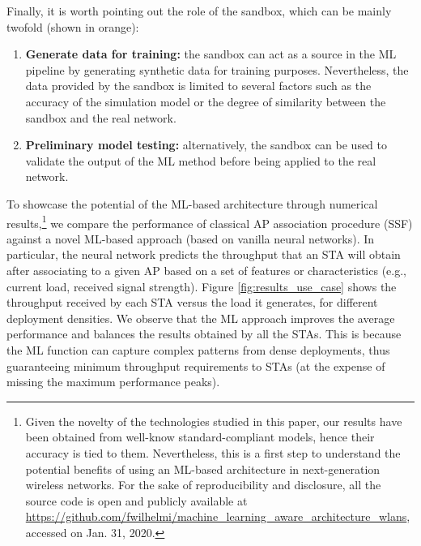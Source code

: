 \documentclass[journal]{IEEEtran}
\begin{document}
Finally, it is worth pointing out the role of the sandbox, which can be mainly twofold (shown in orange):
\begin{enumerate}
	\item \textbf{Generate data for training:} the sandbox can act as a source in the ML pipeline by generating synthetic data for training purposes. Nevertheless, the data provided by the sandbox is limited to several factors such as the accuracy of the simulation model or the degree of similarity between the sandbox and the real network. %
	\item \textbf{Preliminary model testing:} alternatively, the sandbox can be used to validate the output of the ML method before being applied to the real network.
\end{enumerate}

To showcase the potential of the ML-based architecture through numerical results,\footnote{Given the novelty of the technologies studied in this paper, our results have been obtained from well-know standard-compliant models, hence their accuracy is tied to them. Nevertheless, this is a first step to understand the potential benefits of using an ML-based architecture in next-generation wireless networks. For the sake of reproducibility and disclosure, all the source code is open and publicly available at \href{https://github.com/fwilhelmi/machine_learning_aware_architecture_wlans}{https://github.com/fwilhelmi/machine\_learning\_aware\_architecture\_wlans}, accessed on Jan. 31, 2020.} we compare the performance of classical AP association procedure (SSF) against a novel ML-based approach (based on vanilla neural networks). In particular, the neural network predicts the throughput that an STA will obtain after associating to a given AP based on a set of features or characteristics (e.g., current load, received signal strength). Figure \ref{fig:results_use_case} shows the throughput received by each STA versus the load it generates, for different deployment densities. We observe that the ML approach improves the average performance and balances the results obtained by all the STAs. This is because the ML function can capture complex patterns from dense deployments, thus guaranteeing minimum throughput requirements to STAs (at the expense of missing the maximum performance peaks).
\end{document}
